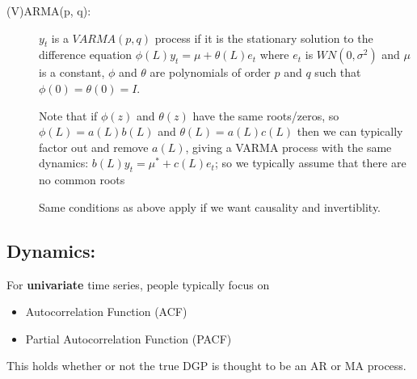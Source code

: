 \begin{description}
\item[(V)ARMA(p, q):] $y_t$ is a $VARMA(p,q)$ process if it is the
  stationary solution to the difference equation $\phi(L) y_t = \mu + \theta(L)
  e_t$ where $e_t$ is $WN(0, \sigma^2)$ and $\mu$ is a constant, $\phi$ and $\theta$
  are polynomials of order $p$ and $q$ such that $\phi(0) = \theta(0) = I$.

  Note that if $\phi(z)$ and $\theta(z)$ have the same roots/zeros, so $\phi(L) =
  a(L) b(L)$ and $\theta(L) = a(L) c(L)$ then we can typically factor out
  and remove $a(L)$, giving a VARMA process with the same dynamics:
  $b(L) y_t = \mu^* + c(L) e_t$; so we typically assume that there are
  no common roots

  Same conditions as above apply if we want causality and
  invertiblity.
\end{description}

\subsection{Dynamics:}

For \textbf{univariate} time series, people typically focus on
\begin{itemize}
\item Autocorrelation Function (ACF)
\item Partial Autocorrelation Function (PACF)
\end{itemize}
This holds whether or not the true DGP is thought to be an AR or MA
process.

